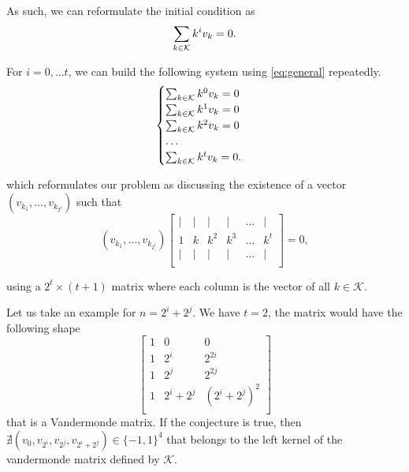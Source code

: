 As such, we can reformulate the initial condition as
\begin{equation}\label{eq:general}
    \sum_{k \in \mathcal{K}} k^iv_k = 0.
\end{equation}

For $i = 0, \ldots t$, we can build the following system using \cref{eq:general} repeatedly.
\begin{equation}
    \begin{cases}
        \sum_{k \in \mathcal{K}} k^0v_k = 0\\
        \sum_{k \in \mathcal{K}} k^1v_k = 0\\
        \sum_{k \in \mathcal{K}} k^2v_k = 0\\
        \ldots\\
        \sum_{k \in \mathcal{K}} k^tv_k = 0.\\
    \end{cases}
\end{equation}

which reformulates our problem as discussing the existence of a vector $(v_{k_1}, \ldots, v_{k_{2^t}})$ such that
$$
(v_{k_1}, \ldots, v_{k_{2^t}})
\begin{bmatrix}
    | & | & | & | & \ldots & |\\
    1 & k & k^2 & k^3 & \ldots & k^t\\
    | & | & | & | & \ldots & |\\
\end{bmatrix} = 0,
$$

using a  $2^t \times (t + 1)$ matrix where each column is the vector of all $k \in \mathcal{K}$.

Let us take an example for $n = 2^i + 2^j$. We have $t = 2$, the matrix would have the following shape
$$
\begin{bmatrix}
    1 & 0 & 0\\
    1 & 2^i & 2^{2i}\\
    1 & 2^j & 2^{2j}\\
    1 & 2^i + 2^j & (2^i + 2^j)^2\\
\end{bmatrix}
$$
that is a Vandermonde matrix. If the conjecture is true, then $\nexists (v_0, v_{2^i}, v_{2^j}, v_{2^i + 2^j}) \in \{-1, 1\}^4$ that belongs to the left kernel of the vandermonde matrix defined by $\mathcal{K}$.

